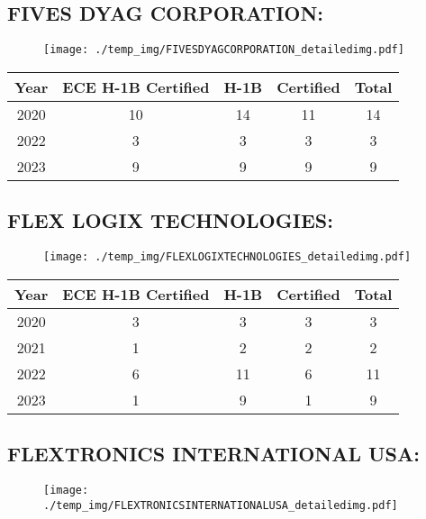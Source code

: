 \documentclass{article}%
\begin{document}
%
\newpage%
\subsection{FIVES DYAG CORPORATION:}%
\label{subsec:FIVESDYAGCORPORATION}%
\label{FIVESDYAGCORPORATIONdetailed}%


\begin{figure}[htbp]%
\centering%
\texttt{[image: ./temp\_img/FIVESDYAGCORPORATION\_detailedimg.pdf]}%
\end{figure}

%
\begin{longtable}{c|c|c|c|c}%
\hline%
Year&ECE H{-}1B Certified&H{-}1B&Certified&Total\\%
\hline%
2020&10&14&11&14\\%
\hline%
2022&3&3&3&3\\%
\hline%
2023&9&9&9&9\\%
\hline%
\end{longtable}

%
\newpage%
\subsection{FLEX LOGIX TECHNOLOGIES:}%
\label{subsec:FLEXLOGIXTECHNOLOGIES}%
\label{FLEXLOGIXTECHNOLOGIESdetailed}%


\begin{figure}[htbp]%
\centering%
\texttt{[image: ./temp\_img/FLEXLOGIXTECHNOLOGIES\_detailedimg.pdf]}%
\end{figure}

%
\begin{longtable}{c|c|c|c|c}%
\hline%
Year&ECE H{-}1B Certified&H{-}1B&Certified&Total\\%
\hline%
2020&3&3&3&3\\%
\hline%
2021&1&2&2&2\\%
\hline%
2022&6&11&6&11\\%
\hline%
2023&1&9&1&9\\%
\hline%
\end{longtable}

%
\newpage%
\subsection{FLEXTRONICS INTERNATIONAL USA:}%
\label{subsec:FLEXTRONICSINTERNATIONALUSA}%
\label{FLEXTRONICSINTERNATIONALUSAdetailed}%


\begin{figure}[htbp]%
\centering%
\texttt{[image: ./temp\_img/FLEXTRONICSINTERNATIONALUSA\_detailedimg.pdf]}%
\end{figure}
\end{document}
